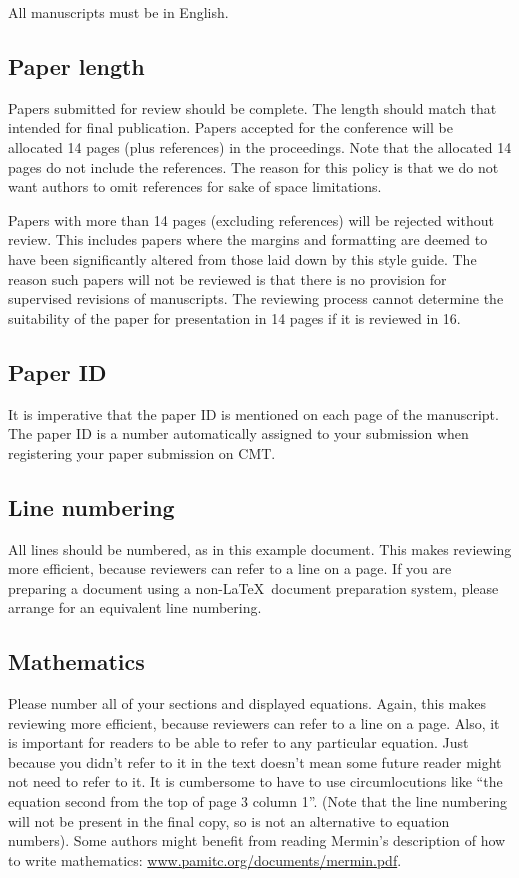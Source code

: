 \documentclass[runningheads]{llncs}
\begin{document}
All manuscripts must be in English.

\subsection{Paper length}
Papers submitted for review should be complete. 
The length should match that intended for final publication. 
Papers accepted for the conference will be allocated 14 pages (plus references) in the proceedings. 
Note that the allocated 14 pages do not include the references. The reason for this policy
is that we do not want authors to omit references for sake of space limitations.

Papers with more than 14 pages (excluding references) will be rejected without review.
This includes papers where the margins and
formatting are deemed to have been significantly altered from those
laid down by this style guide.  The reason such papers will not be
reviewed is that there is no provision for supervised revisions of
manuscripts. The reviewing process cannot determine the suitability of
the paper for presentation in 14 pages if it is reviewed in 16.

\subsection{Paper ID}

It is imperative that the paper ID is mentioned on each page of the manuscript.
The paper ID is a number automatically assigned to your submission when 
registering your paper submission on CMT.


\subsection{Line numbering}

All lines should be numbered, as in this example document.  This makes
reviewing more efficient, because reviewers can refer to a line on a
page.  If you are preparing a document using a non-\LaTeX\
document preparation system, please arrange for an equivalent line numbering.



\subsection{Mathematics}

Please number all of your sections and displayed equations.  Again,
this makes reviewing more efficient, because reviewers can refer to a
line on a page.  Also, it is important for readers to be able to refer
to any particular equation.  Just because you didn't refer to it in
the text doesn't mean some future reader might not need to refer to
it.  It is cumbersome to have to use circumlocutions like ``the
equation second from the top of page 3 column 1''.  (Note that the
line numbering will not be present in the final copy, so is not an
alternative to equation numbers).  Some authors might benefit from
reading Mermin's description of how to write mathematics:
\url{www.pamitc.org/documents/mermin.pdf‎}.
\end{document}
